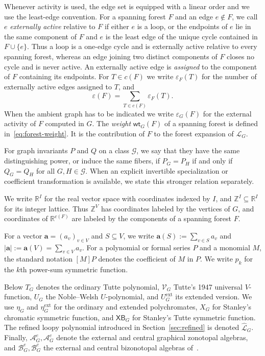 \documentclass[11pt]{article}
\theoremstyle{plain}
\theoremstyle{definition}
\renewcommand{\mathcal}{\mathscr}
\newcommand{\LL}{\mathcal{L}}    %
\newcommand{\BZ}{\mathcal{B}}    %
\newcommand{\cA}{\mathcal{A}}    %
\newcommand{\cG}{\mathcal{G}}    %
\newcommand{\cV}{\mathcal{V}}    %
\newcommand{\ba}{\mathbf{a}}
\newcommand{\XB}{\mathsf{XB}} %
\newcommand{\wt}{\mathsf{wt}}
\newcommand{\eps}{\varepsilon}
\newcommand{\ext}{\mathrm{ext}}
\newcommand{\ZZ}{\mathbb Z}
\newcommand{\RR}{\mathbb R}
\numberwithin{equation}{section}
\begin{document}
Whenever activity is used, the edge set is equipped with a linear order and we
use the least-edge convention.  For a spanning forest $F$ and an edge $e\notin
F$, we call $e$ \emph{externally active} relative to $F$ if either $e$ is a
loop, or the endpoints of $e$ lie in the same component of $F$ and $e$ is the
least edge of the unique cycle contained in $F\cup\{e\}$.  Thus a loop is a
one-edge cycle and is externally active relative to every spanning forest,
whereas an edge joining two distinct components of $F$ closes no cycle and is
never active.  An externally active edge is \emph{assigned} to the component
of $F$ containing its endpoints.  For $T\in c(F)$ we write $\eps_F(T)$
for the number of externally active edges assigned to $T$, and
\[
   \eps(F)=\sum_{T\in c(F)}\eps_F(T).
\]
When the ambient graph has to be indicated we write $\eps_G(F)$ for the external activity
of $F$ computed in $G$.  The \emph{weight} $\wt_G(F)$ of a spanning forest
is defined in~\eqref{eq:forest-weight}. It is the contribution of $F$ to the forest expansion of $\LL_G$.

For graph invariants $P$ and $Q$ on a class $\cG$, we say that they have
the same distinguishing power, or induce the same fibers, if $P_G=P_H$
if and only if $Q_G=Q_H$ for all $G,H\in\cG$.  When an explicit invertible specialization or
coefficient transformation is available, we state this stronger relation separately.

We write $\RR^I$ for the real vector space with coordinates indexed by $I$, and $\ZZ^I \subseteq \RR^I$
for its integer lattice. Thus $\ZZ^{V}$ has coordinates labeled by the vertices of $G$,
and coordinates of $\RR^{c(F)}$ are  labeled by the components of a spanning forest $F$.

For a vector $\ba=(a_v)_{v\in V}$ and $S\subseteq V$, we write
$\ba(S):=\sum_{v\in S}a_v$ and $|\ba|:=\ba(V)=\sum_{v\in V}a_v$.
For a polynomial or formal series $P$ and a monomial $M$, the standard notation
$[M]P$ denotes the coefficient of $M$ in $P$.  We write $p_k$ for the $k$th power-sum symmetric function.

Below $T_G$ denotes the ordinary Tutte polynomial,
$\cV_G$ Tutte's 1947 universal $V$-function, $U_G$ the Noble--Welsh $U$-polynomial,
and $U_G^{\ext}$ its extended version.
We use $\eta_G$ and $\eta_G^{\ext}$ for the ordinary and extended polychromates,
$X_G$ for Stanley's chromatic symmetric function, and $\XB_G$ for Stanley's Tutte symmetric function.
The refined loopy polynomial introduced in Section~\ref{sec:refined} is denoted $\widehat{\LL}_G$.
Finally, $\cA_G^e,\cA_G^c$ denote the external and central graphical zonotopal algebras,
and $\BZ_G^e,\BZ_G^c$ the external and central bizonotopal algebras of~\cite{KNSV}.
\end{document}
